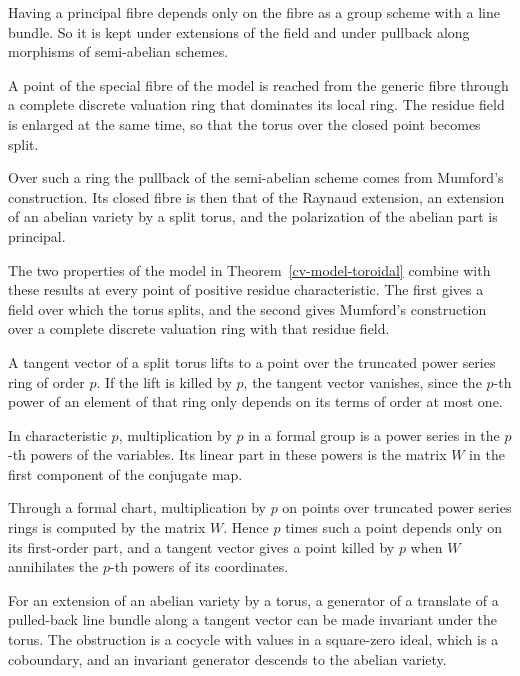 Having a principal fibre depends only on the fibre as a group scheme with a line bundle. So it is kept
under extensions of the field and under pullback along morphisms of semi-abelian schemes.

A point of the special fibre of the model is reached from the generic fibre through a complete discrete
valuation ring that dominates its local ring. The residue field is enlarged at the same time, so that the
torus over the closed point becomes split.

Over such a ring the pullback of the semi-abelian scheme comes from Mumford's construction. Its closed
fibre is then that of the Raynaud extension, an extension of an abelian variety by a split torus, and the
polarization of the abelian part is principal.

The two properties of the model in Theorem~\ref{cv-model-toroidal} combine with these results at every
point of positive residue characteristic. The first gives a field over which the torus splits, and the
second gives Mumford's construction over a complete discrete valuation ring with that residue field.

A tangent vector of a split torus lifts to a point over the truncated power series ring of order $p$. If
the lift is killed by $p$, the tangent vector vanishes, since the $p$-th power of an element of that ring
only depends on its terms of order at most one.

In characteristic $p$, multiplication by $p$ in a formal group is a power series in the $p$-th powers of
the variables. Its linear part in these powers is the matrix $W$ in the first component of the conjugate
map.

Through a formal chart, multiplication by $p$ on points over truncated power series rings is computed by
the matrix $W$. Hence $p$ times such a point depends only on its first-order part, and a tangent vector
gives a point killed by $p$ when $W$ annihilates the $p$-th powers of its coordinates.

For an extension of an abelian variety by a torus, a generator of a translate of a pulled-back line bundle
along a tangent vector can be made invariant under the torus. The obstruction is a cocycle with values in
a square-zero ideal, which is a coboundary, and an invariant generator descends to the abelian variety.

